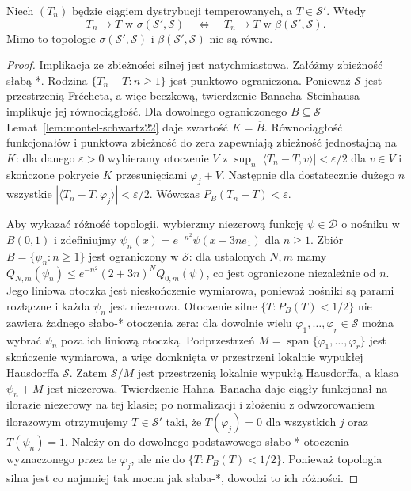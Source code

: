 \begin{twierdzenie}
\label{thm:seq-topologies-schwartz22}
Niech $(T_n)$ będzie ciągiem dystrybucji temperowanych,
a $T\in\mathcal S'$. Wtedy
\[
T_n\longrightarrow T\text{ w }\sigma(\mathcal S',\mathcal S)
\quad\Longleftrightarrow\quad
T_n\longrightarrow T\text{ w }\beta(\mathcal S',\mathcal S).
\]
Mimo to topologie $\sigma(\mathcal S',\mathcal S)$ i
$\beta(\mathcal S',\mathcal S)$ nie są równe.
\end{twierdzenie}
\begin{proof}
Implikacja ze zbieżności silnej jest natychmiastowa.
Załóżmy zbieżność słabą-*. Rodzina
$\{T_n-T:n\ge1\}$ jest punktowo ograniczona.
Ponieważ $\mathcal S$ jest przestrzenią Frécheta,
a więc beczkową, twierdzenie Banacha--Steinhausa
implikuje jej równociągłość.
Dla dowolnego ograniczonego $B\subseteq\mathcal S$
Lemat~\ref{lem:montel-schwartz22} daje zwartość
$K=\overline B$. Równociągłość funkcjonałów i
punktowa zbieżność do zera zapewniają zbieżność
jednostajną na $K$: dla danego $\varepsilon>0$
wybieramy otoczenie $V$ z
$\sup_n|\langle T_n-T,v\rangle|<\varepsilon/2$
dla $v\in V$ i skończone pokrycie $K$ przesunięciami
$\varphi_j+V$. Następnie dla dostatecznie dużego $n$
wszystkie $|\langle T_n-T,\varphi_j\rangle|<\varepsilon/2$.
Wówczas $P_B(T_n-T)<\varepsilon$.

Aby wykazać różność topologii, wybierzmy niezerową funkcję
$\psi\in\mathcal D$ o nośniku w $B(0,1)$ i zdefiniujmy
$\psi_n(x)=e^{-n^2}\psi(x-3ne_1)$ dla $n\ge1$.
Zbiór $B=\{\psi_n:n\ge1\}$ jest ograniczony w
$\mathcal S$: dla ustalonych $N,m$ mamy
$Q_{N,m}(\psi_n)\le e^{-n^2}(2+3n)^N Q_{0,m}(\psi)$,
co jest ograniczone niezależnie od $n$.
Jego liniowa otoczka jest nieskończenie wymiarowa,
ponieważ nośniki są parami rozłączne i każda $\psi_n$
jest niezerowa.
Otoczenie silne $\{T:P_B(T)<1/2\}$ nie zawiera
żadnego słabo-* otoczenia zera: dla dowolnie wielu
$\varphi_1,\ldots,\varphi_r\in\mathcal S$
można wybrać $\psi_n$ poza ich liniową otoczką.
Podprzestrzeń $M=\operatorname{span}\{\varphi_1,\ldots,
\varphi_r\}$ jest skończenie wymiarowa, a więc domknięta
w przestrzeni lokalnie wypukłej Hausdorffa $\mathcal S$.
Zatem $\mathcal S/M$ jest przestrzenią lokalnie wypukłą
Hausdorffa, a klasa $\psi_n+M$ jest niezerowa.
Twierdzenie Hahna--Banacha daje ciągły funkcjonał
na ilorazie niezerowy na tej klasie; po normalizacji
i złożeniu z odwzorowaniem ilorazowym otrzymujemy
$T\in\mathcal S'$ taki, że $T(\varphi_j)=0$ dla
wszystkich $j$ oraz $T(\psi_n)=1$.
Należy on do dowolnego podstawowego słabo-* otoczenia
wyznaczonego przez te $\varphi_j$, ale nie do
$\{T:P_B(T)<1/2\}$. Ponieważ topologia silna jest
co najmniej tak mocna jak słaba-*, dowodzi to ich różności.
\end{proof}

